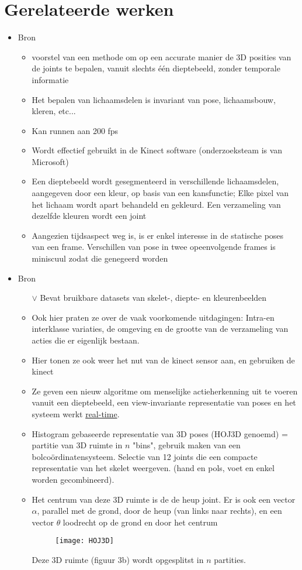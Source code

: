 \chapter{Gerelateerde werken}

\begin{itemize}
	\item Bron \cite{real-time-human-pose-recognition-in-parts-from-a-single-depth-image}
	\begin{itemize}
		\item voorstel van een methode om op een accurate manier de 3D posities van de joints te bepalen, vanuit slechts één dieptebeeld, zonder temporale informatie
		\item Het bepalen van lichaamsdelen is invariant van pose, lichaamsbouw, kleren, etc...
		\item Kan runnen aan 200 fps
		\item Wordt effectief gebruikt in de Kinect software (onderzoeksteam is van Microsoft)
		\item Een dieptebeeld wordt gesegmenteerd in verschillende lichaamsdelen, aangegeven door een kleur, op basis van een kansfunctie; Elke pixel van het lichaam wordt apart behandeld en gekleurd. Een verzameling van dezelfde kleuren wordt een joint
		\item Aangezien tijdsaspect weg is, is er enkel interesse in de statische poses van een frame. Verschillen van pose in twee opeenvolgende frames is miniscuul zodat die genegeerd worden
	\end{itemize}

	\item Bron \cite{xia2012view}
	\begin{itemize}
		\item[$\vee$] Bevat bruikbare datasets van skelet-, diepte- en kleurenbeelden
		\item Ook hier praten ze over de vaak voorkomende uitdagingen: Intra-en interklasse variaties, de omgeving en de grootte van de verzameling van acties die er eigenlijk bestaan.
		\item Hier tonen ze ook weer het nut van de kinect sensor aan, en gebruiken de kinect
		\item Ze geven een nieuw algoritme om menselijke actieherkenning uit te voeren vanuit een dieptebeeld, een view-invariante representatie van poses en het systeem werkt \underline{real-time}.
		\item Histogram gebaseerde representatie van 3D poses (HOJ3D genoemd) = partitie van 3D ruimte in $n$ "bins", gebruik maken van een bolcoördinatensysteem. Selectie van 12 joints die een compacte representatie van het skelet weergeven. (hand en pols, voet en enkel worden gecombineerd).
		\item Het centrum van deze 3D ruimte is de de heup joint. Er is ook een vector $\alpha$, parallel met de grond, door de heup (van links naar rechts), en een vector $\theta$ loodrecht op de grond en door het centrum
			\begin{figure}[ht]
				\centering
			\texttt{[image: HOJ3D]}
			\end{figure}
			Deze 3D ruimte (figuur 3b) wordt opgesplitst in $n$ partities.
			

\end{itemize}
\end{itemize}
